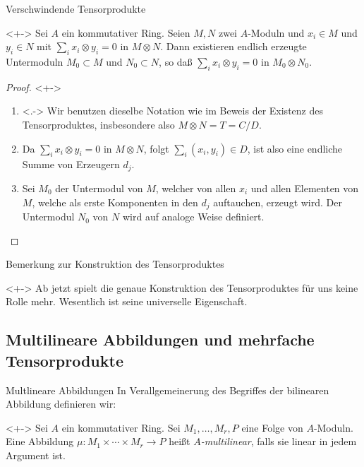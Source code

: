\begin{frame}{Verschwindende Tensorprodukte}
	\begin{corollary}<+->
		Sei \(A\) ein kommutativer Ring. Seien \(M, N\) zwei \(A\)-Moduln und \(x_i \in M\) und
		\(y_i \in N\) mit \(\sum\limits_{i} x_i \otimes y_i = 0\) in \(M \otimes N\). Dann existieren endlich
		erzeugte Untermoduln \(M_0 \subset M\) und \(N_0 \subset N\), so daß
		\(\sum\limits_{i} x_i \otimes y_i = 0\) in \(M_0 \otimes N_0\).
	\end{corollary}
	\begin{proof}<+->
		\begin{enumerate}[<+->]
		\item<.->
			Wir benutzen dieselbe Notation wie im Beweis der Existenz des Tensorproduktes, insbesondere also
			\(M \otimes N = T = C/D\).
		\item
			Da \(\sum\limits_{i} x_i \otimes y_i = 0\) in \(M \otimes N\), folgt
			\(\sum\limits_{i} (x_i, y_i) \in D\), ist also eine endliche Summe von Erzeugern \(d_j\).
		\item
			Sei \(M_0\) der Untermodul von \(M\), welcher von allen \(x_i\) und allen Elementen von \(M\),
			welche als
			erste Komponenten in den \(d_j\) auftauchen, erzeugt wird.
			Der Untermodul \(N_0\) von \(N\) wird auf analoge Weise definiert.
			\qedhere
		\end{enumerate}
	\end{proof}
\end{frame}

\begin{frame}{Bemerkung zur Konstruktion des Tensorproduktes}
	\begin{remark}<+->
		Ab jetzt spielt die genaue Konstruktion des Tensorproduktes für uns keine Rolle mehr. Wesentlich
		ist seine universelle Eigenschaft.
	\end{remark}
\end{frame}

\subsection{Multilineare Abbildungen und mehrfache Tensorprodukte}

\begin{frame}{Multlineare Abbildungen}
	In Verallgemeinerung des Begriffes der bilinearen Abbildung definieren wir:
	\begin{definition}<+->
		Sei \(A\) ein kommutativer Ring. Sei \(M_1, \dotsc, M_r, P\) eine Folge von \(A\)-Moduln.
		\\
		Eine Abbildung \(\mu\colon M_1 \times \dotsb \times M_r \to P\) heißt \emph{\(A\)-multilinear}, falls
		sie linear in jedem Argument ist.
	\end{definition}
\end{frame}

